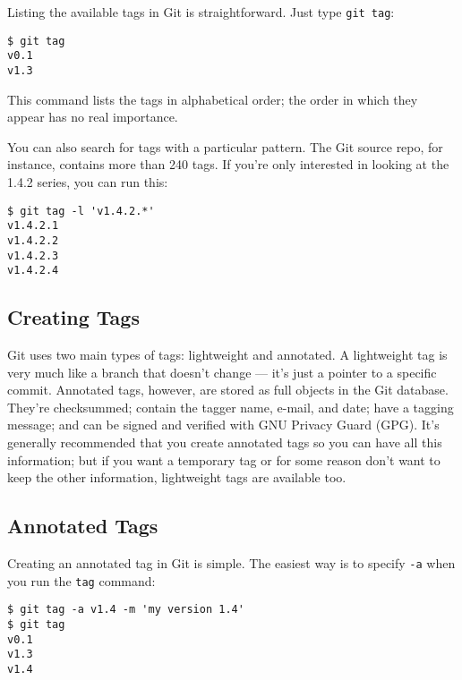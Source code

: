 \documentclass[a4paper]{book}
\newcounter{tab}[chapter]
\begin{document}
Listing the available tags in Git is straightforward. Just type \texttt{git tag}:

\begin{shaded}\begin{verbatim}
$ git tag
v0.1
v1.3
\end{verbatim}\end{shaded}

This command lists the tags in alphabetical order; the order in which they appear has no real importance.

You can also search for tags with a particular pattern. The Git source repo, for instance, contains more than 240 tags. If you're only interested in looking at the 1.4.2 series, you can run this:

\begin{shaded}\begin{verbatim}
$ git tag -l 'v1.4.2.*'
v1.4.2.1
v1.4.2.2
v1.4.2.3
v1.4.2.4
\end{verbatim}\end{shaded}

\subsection{Creating Tags}

Git uses two main types of tags: lightweight and annotated. A lightweight tag is very much like a branch that doesn't change --- it's just a pointer to a specific commit. Annotated tags, however, are stored as full objects in the Git database. They're checksummed; contain the tagger name, e-mail, and date; have a tagging message; and can be signed and verified with GNU Privacy Guard (GPG). It's generally recommended that you create annotated tags so you can have all this information; but if you want a temporary tag or for some reason don't want to keep the other information, lightweight tags are available too.

\subsection{Annotated Tags}

Creating an annotated tag in Git is simple. The easiest way is to specify \texttt{-a} when you run the \texttt{tag} command:

\begin{shaded}\begin{verbatim}
$ git tag -a v1.4 -m 'my version 1.4'
$ git tag
v0.1
v1.3
v1.4
\end{verbatim}\end{shaded}
\end{document}

